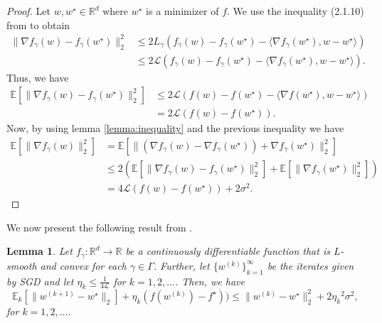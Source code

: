 \documentclass[12pt]{article}
\newtheorem{lemma}[theorem]{Lemma}
\theoremstyle{definition}
\numberwithin{equation}{section}
\newcommand{\R}{\mathbb{R}}
\newcommand{\E}{\mathbb{E}}
\newcommand{\CL}{\mathcal{L}}
\newcommand{\ev}[1]{\mathbb{E}\left[{#1}\right]}
\newcommand{\norm}[1]{\lVert{#1}\rVert_2}
\begin{document}
\begin{proof}
  Let $w, w^\star \in \R^d$ where $w^\star$ is a minimizer of $f$. We use the inequality (2.1.10) from \autocite{nesterovLecturesConvexOptimization2018} to obtain
  \begin{align*}
    \norm{\nabla f_{\gamma}(w) - f_{\gamma}(w^\star)}^2 &\leq 2L_{\gamma}(f_{\gamma}(w) - f_{\gamma}(w^\star) - \langle \nabla f_{\gamma}(w^\star), w - w^\star \rangle) \\
    &\leq 2\CL(f_{\gamma}(w) - f_{\gamma}(w^\star) - \langle \nabla f_{\gamma}(w^\star), w - w^\star \rangle).
  \end{align*}
  Thus, we have
  \begin{align*}
    \ev{\norm{\nabla f_{\gamma}(w) - f_{\gamma}(w^\star)}^2 } &\leq 2\CL(f(w) - f(w^\star) - \langle \nabla f(w^\star), w - w^\star \rangle) \\
    &= 2\CL(f(w) - f(w^\star)).
  \end{align*}
  Now, by using lemma \ref{lemma:inequality} and the previous inequality we have
  \begin{align*}
    \ev{\norm{\nabla f_{\gamma}(w)}^2} &= \ev{\norm{(\nabla f_{\gamma}(w) - \nabla f_{\gamma}(w^\star)) + \nabla f_{\gamma}(w^\star)}^2} \\
    &\leq 2( \ev{\norm{\nabla f_{\gamma}(w) - f_{\gamma}(w^\star)}^2 } + \ev{\norm{\nabla f_{\gamma}(w^\star)}^2}) \\
    &= 4\CL(f(w) - f(w^\star)) + 2\sigma^2.
  \end{align*}
\end{proof}
We now present the following result from \autocite{sebbouhAlmostSureConvergence2021}.
\begin{lemma}
  \label{lemma:sgd_iterates}
  Let $f_{\gamma} : \R^d \rightarrow \R$ be a continuously differentiable function that is $L$-smooth and convex for each $\gamma \in \Gamma$. Further, let $\{w^{(k)}\}_{k=1}^{\infty}$ be the iterates given by SGD and let $\eta_k \leq \frac{1}{4 \CL}$ for $k=1,2,\dots$. Then, we have
  \begin{equation*}
    \E_k[\norm{w^{(k+1)} - w^\star}] + \eta_k (f(w^{(k)}) - f^\star)) \leq \norm{w^{(k)} - w^\star}^2 + 2{\eta_k}^2\sigma^2,
  \end{equation*}
  for $k=1,2,\dots$.
\end{lemma}
\end{document}
